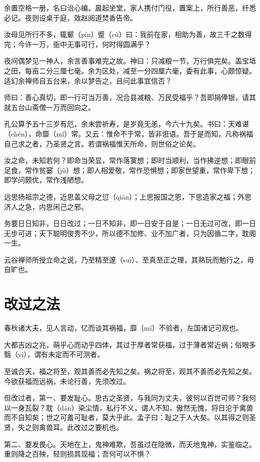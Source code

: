 \documentclass[12pt,UTF8]{ctexbook}
\begin{document}
余置空格一册，名曰治心编。晨起坐堂，家人携付门役，置案上，所行善恶，纤悉必记。夜则设桌于庭，效赵阅道焚香告帝。

汝母见所行不多，辄颦（pín）蹙（cù）曰：我前在家，相助为善，故三千之数得完；今许一万，衙中无事可行，何时得圆满乎？

夜间偶梦见一神人，余言善事难完之故。神曰：只减粮一节，万行俱完矣。盖宝坻之田，每亩二分三厘七毫。余为区处，减至一分四厘六毫，委有此事，心颇惊疑。适幻余禅师自五台来，余以梦告之，且问此事宜信否？

师曰：善心真切，即一行可当万善，况合县减粮、万民受福乎？吾即捐俸银，请其就五台山斋僧一万而回向之。

孔公算予五十三岁有厄，余未尝祈寿，是岁竟无恙，今六十九矣。书曰：天难谌（chén），命靡（mí）常。又云：惟命不于常，皆非诳语。吾于是而知，凡称祸福自己求之者，乃圣贤之言。若谓祸福惟天所命，则世俗之论矣。

汝之命，未知若何？即命当荣显，常作落寞想；即时当顺利，当作拂逆想；即眼前足食，常作贫窭（jù）想；即人相爱敬，常作恐惧想；即家世望重，常作卑下想；即学问颇优，常作浅陋想。

远思扬祖宗之德，近思盖父母之愆（qiān）；上思报国之恩，下思造家之福；外思济人之急，内思闲己之邪。

务要日日知非，日日改过；一日不知非，即一日安于自是；一日无过可改，即一日无步可进；天下聪明俊秀不少，所以德不加修、业不加广者，只为因循二字，耽阁一生。

云谷禅师所授立命之说，乃至精至邃（suì）、至真至正之理，其熟玩而勉行之，毋自旷也。


\chapter{改过之法}

春秋诸大夫，见人言动，亿而谈其祸福，靡（mí）不验者，左国诸记可观也。

大都吉凶之兆，萌乎心而动乎四体，其过于厚者常获福，过于薄者常近祸；俗眼多翳（yì），谓有未定而不可测者。

至诚合天，福之将至，观其善而必先知之矣。祸之将至，观其不善而必先知之矣。今欲获福而远祸，未论行善，先须改过。

但改过者，第一、要发耻心。思古之圣贤，与我同为丈夫，彼何以百世可师？我何以一身瓦裂？耽（dān）染尘情，私行不义，谓人不知，傲然无愧，将日沦于禽兽而不自知矣；世之可羞可耻者，莫大乎此。孟子曰：耻之于人大矣。以其得之则圣贤，失之则禽兽耳。此改过之要机也。

第二、要发畏心。天地在上，鬼神难欺，吾虽过在隐微，而天地鬼神，实鉴临之。重则降之百殃，轻则损其现福；吾何可以不惧？
\end{document}
